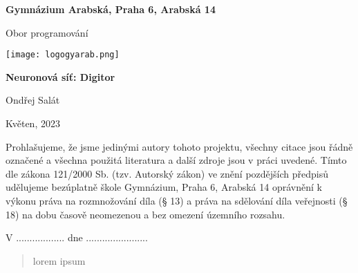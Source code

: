 
\begin{titlepage}
    \begin{center}
        \large \vspace*{\fill}
        \thispagestyle{empty}

        \LARGE

        { \huge \textbf{Gymnázium Arabská, Praha 6, Arabská 14}}

        {\LARGE Obor programování }

        \vfill
        \texttt{[image: logogyarab.png]}
        \vspace{15pt}

        \vfill

        {\huge \textbf{Neuronová síť: Digitor}}

        \vfill

        Ondřej Salát

        \vfill

        {\large Květen, 2023}

        \vspace*{\fill}
    \end{center}
\end{titlepage}

\thispagestyle{empty}
\addtocounter{page}{-1}
\vspace*{\fill}
Prohlašujeme, že jsme jedinými autory tohoto projektu, všechny citace jsou řádně označené a všechna
použitá literatura a další zdroje jsou v práci uvedené. Tímto dle zákona 121/2000 Sb. (tzv. Autorský zákon)
ve znění pozdějších předpisů udělujeme bezúplatně škole Gymnázium, Praha 6, Arabská 14 oprávnění k výkonu
práva na rozmnožování díla (§ 13) a práva na sdělování díla veřejnosti (§ 18) na dobu časově neomezenou a
bez omezení územního rozsahu.

\vspace{2cm}
V .................. dne .......................


\vspace{2cm}

\newpage
\begin{abstract}
    lorem ipsum
\end{abstract}

\tableofcontents